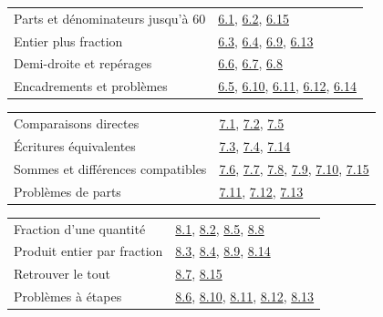 \begin{tabularx}{\linewidth}{@{}Yl@{}}\toprule
Parts et dénominateurs jusqu’à 60 & \hyperref[exo-6-1]{6.1}, \hyperref[exo-6-2]{6.2}, \hyperref[exo-6-15]{6.15}\\[2mm]
Entier plus fraction & \hyperref[exo-6-3]{6.3}, \hyperref[exo-6-4]{6.4}, \hyperref[exo-6-9]{6.9}, \hyperref[exo-6-13]{6.13}\\[2mm]
Demi-droite et repérages & \hyperref[exo-6-6]{6.6}, \hyperref[exo-6-7]{6.7}, \hyperref[exo-6-8]{6.8}\\[2mm]
Encadrements et problèmes & \hyperref[exo-6-5]{6.5}, \hyperref[exo-6-10]{6.10}, \hyperref[exo-6-11]{6.11}, \hyperref[exo-6-12]{6.12}, \hyperref[exo-6-14]{6.14}\\[2mm]
\bottomrule\end{tabularx}\par\vspace{4mm}
\clearpage
{}\fontsize{10}{13}\selectfont
{}\begin{tabularx}{\linewidth}{@{}Yl@{}}\toprule
Comparaisons directes & \hyperref[exo-7-1]{7.1}, \hyperref[exo-7-2]{7.2}, \hyperref[exo-7-5]{7.5}\\[2mm]
Écritures équivalentes & \hyperref[exo-7-3]{7.3}, \hyperref[exo-7-4]{7.4}, \hyperref[exo-7-14]{7.14}\\[2mm]
Sommes et différences compatibles & \hyperref[exo-7-6]{7.6}, \hyperref[exo-7-7]{7.7}, \hyperref[exo-7-8]{7.8}, \hyperref[exo-7-9]{7.9}, \hyperref[exo-7-10]{7.10}, \hyperref[exo-7-15]{7.15}\\[2mm]
Problèmes de parts & \hyperref[exo-7-11]{7.11}, \hyperref[exo-7-12]{7.12}, \hyperref[exo-7-13]{7.13}\\[2mm]
\bottomrule\end{tabularx}\par\vspace{4mm}
\begin{tabularx}{\linewidth}{@{}Yl@{}}\toprule
Fraction d’une quantité & \hyperref[exo-8-1]{8.1}, \hyperref[exo-8-2]{8.2}, \hyperref[exo-8-5]{8.5}, \hyperref[exo-8-8]{8.8}\\[2mm]
Produit entier par fraction & \hyperref[exo-8-3]{8.3}, \hyperref[exo-8-4]{8.4}, \hyperref[exo-8-9]{8.9}, \hyperref[exo-8-14]{8.14}\\[2mm]
Retrouver le tout & \hyperref[exo-8-7]{8.7}, \hyperref[exo-8-15]{8.15}\\[2mm]
Problèmes à étapes & \hyperref[exo-8-6]{8.6}, \hyperref[exo-8-10]{8.10}, \hyperref[exo-8-11]{8.11}, \hyperref[exo-8-12]{8.12}, \hyperref[exo-8-13]{8.13}\\[2mm]
\bottomrule\end{tabularx}\par\vspace{4mm}
